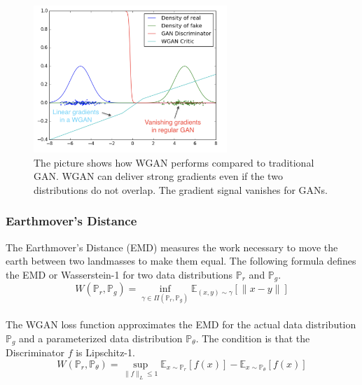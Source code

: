 \begin{figure}[H]
    \centering
    \includegraphics[width=0.65\textwidth]{resources/images/wgan1.png}
    \caption{The picture shows how WGAN performs compared to traditional GAN. WGAN can deliver strong gradients even if the two distributions do not overlap. The gradient signal vanishes for GANs.}
    \label{fig:wgan1}
\end{figure}

 
\subsubsection{Earthmover's Distance}

The Earthmover's Distance (EMD) \cite{emd} measures the work necessary to move the earth between two landmasses to make them equal. The following formula defines the EMD or Wasserstein-1 for two data distributions $ \mathbb{P}_{r} $  and $ \mathbb{P}_{g} $.\\

\begin{equation}
    W\left(\mathbb{P}_{r}, \mathbb{P}_{g}\right)=\inf _{\gamma \in \Pi\left(\mathbb{P}_{r}, \mathbb{P}_{g}\right)} \mathbb{E}_{(x, y) \sim \gamma}[\|x-y\|]
\end{equation}\\

The WGAN loss function approximates the EMD for the actual data distribution $ \mathbb{P}_{g} $ and a parameterized data distribution $ \mathbb{P}_{\theta} $. The condition is that the Discriminator $ f $ is Lipschitz-1.\\

\begin{equation}
    W\left(\mathbb{P}_{r}, \mathbb{P}_{\theta}\right)=\sup _{\|f\|_{L} \leq 1} \mathbb{E}_{x \sim \mathbb{P}_{r}}[f(x)]-\mathbb{E}_{x \sim \mathbb{P}_{\theta}}[f(x)]
\end{equation}\\

